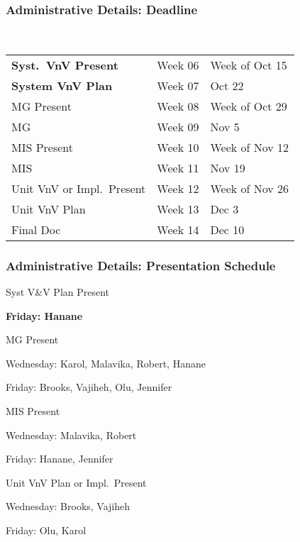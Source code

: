 \documentclass[t,12pt,numbers,fleqn]{beamer}
\begin{document}



\begin{frame}
\frametitle{Administrative Details: Deadline}

~\newline
\begin{tabular}{l l l}
\textbf{Syst.\ VnV Present} & Week 06 & Week of Oct 15\\
\textbf{System VnV Plan} & Week 07 & Oct 22\\
MG Present & Week 08 & Week of Oct 29\\
MG & Week 09 & Nov 5\\
MIS Present & Week 10 & Week of Nov 12\\
MIS & Week 11 & Nov 19\\
Unit VnV or Impl.\ Present & Week 12 & Week of Nov 26\\
Unit VnV Plan & Week 13 & Dec 3\\
Final Doc & Week 14 & Dec 10\\
\end {tabular}

\end{frame}


\begin{frame}
\frametitle{Administrative Details: Presentation Schedule}

\bi
\item Syst V\&V Plan Present
\bi
\item \textbf{Friday: Hanane}
\ei
\item MG Present
\bi
\item Wednesday: Karol, Malavika, Robert, Hanane
\item Friday: Brooks, Vajiheh, Olu, Jennifer
\ei
\item MIS Present
\bi
\item Wednesday: Malavika, Robert
\item Friday: Hanane,  Jennifer
\ei
\item Unit VnV Plan or Impl.\ Present
\bi
\item Wednesday: Brooks, Vajiheh
\item Friday: Olu, Karol
\ei

\ei

\end{frame}

\end{document}
